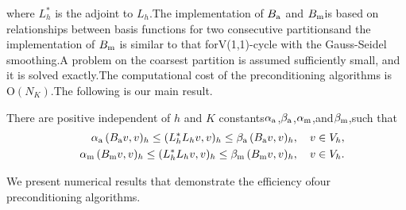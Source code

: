 \documentclass{report}
\begin{document}
where $L_h^*$ is the adjoint to $L_h$.The implementation of $B_{\textup{\scriptsize a}}$ and $B_{\textup{\scriptsize m}}$is based on relationships between basis functions for two consecutive partitionsand the implementation of $B_{\textup{\scriptsize m}}$ is similar to that forV(1,1)-cycle with the Gauss-Seidel smoothing.A problem on the coarsest partition is assumed sufficiently small,
and it is solved exactly.The computational cost of the preconditioning algorithms is $\mbox{O}(N_K)$.The following is our main result.\begin{theorem}There are positive independent of $h$ and $K$ constants$\alpha_{\textup{\scriptsize a}}$,$\beta_{\textup{\scriptsize a}}$,$\alpha_{\textup{\scriptsize m}}$,and$\beta_{\textup{\scriptsize m}}$,such that\begin{eqnarray}\label{eq:spectral_equiv}&&\alpha_{\textup{\scriptsize a}}\,
(B_{\textup{\scriptsize a}}v,v)_h\leq (L_h^*L_hv,v)_h \leq\beta_{\textup{\scriptsize a}}\,
(B_{\textup{\scriptsize a}}v,v)_h,\quad v\in V_h,\\\nonumber&&\alpha_{\textup{\scriptsize m}}\,
(B_{\textup{\scriptsize m}}v,v)_h\leq (L_h^*L_hv,v)_h \leq\beta_{\textup{\scriptsize m}}\,
(B_{\textup{\scriptsize m}}v,v)_h,\quad v\in V_h.\end{eqnarray}\end{theorem}We present numerical results that demonstrate the efficiency ofour preconditioning algorithms.
\end{document}

